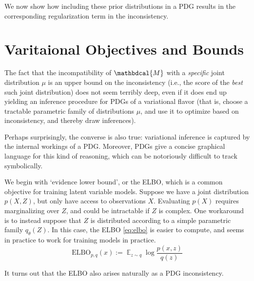 \documentclass{article}
\theoremstyle{plain}
\theoremstyle{definition}
\DeclareMathOperator*{\Ex}{\mathbb{E}} %
\newcommand{\dg}[1]{\mathbdcal{#1}}
\newcommand\todo{\textcolor{red}{Todo: }}
\begin{document}
We now show how including these prior distributions in a PDG results in the corresponding regularization term in the inconsistency.

\section{Varitaional Objectives and Bounds}
\label{sec:theory}





The fact that the incompatibility of $\dg M$ with a \emph{specific} joint distribution $\mu$ is an upper bound on the inconsistency (i.e., the score of the \emph{best} such joint distribution) does not seem terribly deep, even if it does end up yielding an inference procedure for PDGs of a variational flavor (that is, choose a tractable parametric family of distributions $\mu$, and use it to optimize based on inconsistency, and thereby draw inferences).

Perhaps surprisingly, the converse is also true: variational inference is captured by the internal workings of a PDG.  Moreover, PDGs give a concise graphical language for this kind of reasoning, which can be notoriously difficult to track symbolically.

We begin with `evidence lower bound', or the ELBO, which is a common objective for training latent variable models.
Suppose we have a joint distribution $p(X,Z)$, but only have access to observations $X$. Evaluating $p(X)$ requires marginalizing over $Z$, and could be intractable if $Z$ is complex. One workaround is to instead suppose that $Z$ is distributed according to a simple parametric family $q_\theta(Z)$.
In this case, the ELBO \eqref{eq:elbo} is easier to compute, and seems in practice to work for training models in practice.
\begin{equation}
	\mathrm{ELBO}_{p,q}(x) := \Ex_{z \sim q} \log \frac{p(x,z)}{q(z)} \label{eq:elbo}
\end{equation}

It turns out that the ELBO also arises naturally as a PDG inconsistency.
\end{document}
